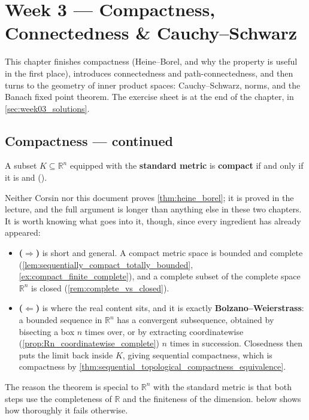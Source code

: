 \chapter{Week 3 --- Compactness, Connectedness \& Cauchy--Schwarz}

This chapter finishes compactness (Heine--Borel, and why the property is useful in the first
place), introduces connectedness and path-connectedness, and then turns to the geometry of inner
product spaces: Cauchy--Schwarz, norms, and the Banach fixed point theorem. The exercise sheet is
at the end of the chapter, in \cref{sec:week03_solutions}.


\section{Compactness --- continued}
\label{sec:compactness_continued}

\begin{theorem}
\label{thm:heine_borel}
A subset $K \subseteq \mathbb{R}^n$ equipped with the \textbf{standard metric} is
\textbf{compact} if and only if it is  and 
().
\end{theorem}

\begin{ainote}
Neither Corsin nor this document proves \cref{thm:heine_borel}; it is proved in the lecture, and
the full argument is longer than anything else in these two chapters. It is worth knowing what
goes into it, though, since every ingredient has already appeared:
\begin{itemize}
  \item \textbf{($\Rightarrow$)} is short and general. A compact metric space is bounded and
    complete (\cref{lem:sequentially_compact_totally_bounded},
    \cref{ex:compact_finite_complete}), and a complete subset of the complete space
    $\mathbb{R}^n$ is closed (\cref{rem:complete_vs_closed}).
  \item \textbf{($\Leftarrow$)} is where the real content sits, and it is exactly
    \textbf{Bolzano--Weierstrass}: a bounded sequence in $\mathbb{R}^n$ has a convergent
    subsequence, obtained by bisecting a box $n$ times over, or by extracting coordinatewise
    (\cref{prop:Rn_coordinatewise_complete}) $n$ times in succession. Closedness then puts the
    limit back inside $K$, giving sequential compactness, which is compactness by
    \cref{thm:sequential_topological_compactness_equivalence}.
\end{itemize}
The reason the theorem is special to $\mathbb{R}^n$ with the standard metric is that both steps
use the completeness of $\mathbb{R}$ and the finiteness of the dimension.
 below shows how thoroughly it fails otherwise.
\end{ainote}


